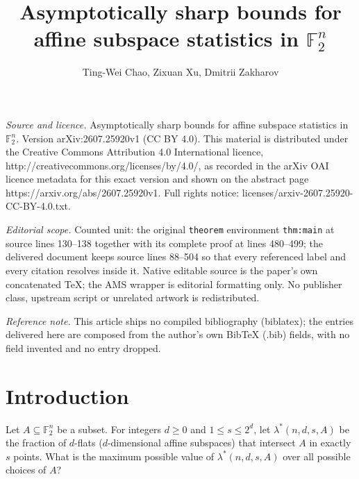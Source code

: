 \documentclass[10pt,a4paper]{amsart}
\newcommand{\F}{\mathbb F}
\begin{document}
\title[Asymptotically sharp bounds for affine subspace statistics i]{Asymptotically sharp bounds for affine subspace statistics in $\mathbb F_2^n$}
\author{Ting-Wei Chao, Zixuan Xu, Dmitrii Zakharov}
\date{}
\maketitle
\noindent\emph{Source and licence.} Asymptotically sharp bounds for affine subspace statistics in $\mathbb F_2^n$. Version arXiv:2607.25920v1 (CC BY 4.0). This material is distributed under the Creative Commons Attribution 4.0 International licence, http://creativecommons.org/licenses/by/4.0/, as recorded in the arXiv OAI licence metadata for this exact version and shown on the abstract page https://arxiv.org/abs/2607.25920v1. Full rights notice: licenses/arxiv-2607.25920-CC-BY-4.0.txt.\par\smallskip
\noindent\textit{Editorial scope.} Counted unit: the original \texttt{theorem} environment \texttt{thm:main} at source lines 130--138 together with its complete proof at lines 480--499; the delivered document keeps source lines 88--504 so that every referenced label and every citation resolves inside it. Native editable source is the paper's own concatenated TeX; the AMS wrapper is editorial formatting only. No publisher class, upstream script or unrelated artwork is redistributed.
\par\smallskip\noindent\textit{Reference note.} This article ships no compiled bibliography (biblatex); the entries delivered here are composed from the author's own BibTeX (.bib) fields, with no field invented and no entry dropped.
\section{Introduction}

Let $A\subseteq \F_2^n$ be a subset. For integers $d\geq 0$ and $1\leq s\leq 2^d$, let $\lambda^*(n,d,s,A)$ be the fraction of $d$-flats ($d$-dimensional affine subspaces) that intersect $A$ in exactly $s$ points. What is the maximum possible value of $\lambda^*(n,d,s,A)$ over all possible choices of $A$?
\end{document}
